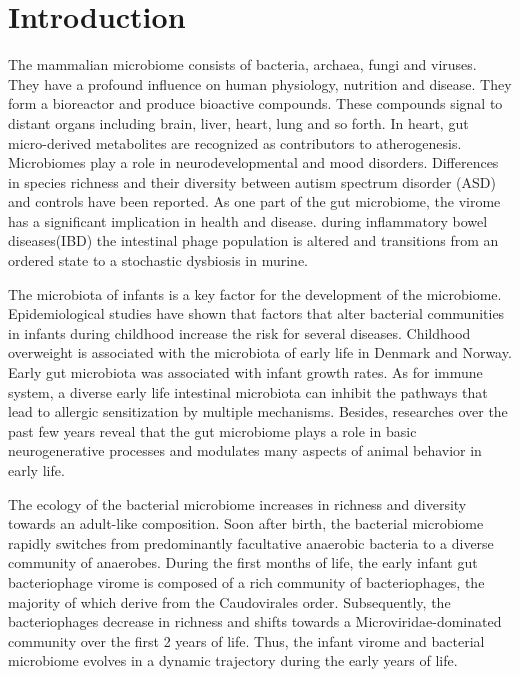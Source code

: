 \documentclass[a4paper][11pt][titlepage]{article}
\begin{document}
  \section{Introduction}
   The mammalian microbiome consists of bacteria, archaea, fungi and viruses.\cite{Lynch2016}
    They have a profound influence on human physiology, nutrition and disease.\cite{Qin2010}
    They form a bioreactor and produce bioactive compounds. 
   These compounds signal to distant organs including brain, liver, heart,
   lung and so forth.\cite{Schroeder2016} In heart, gut micro-derived metabolites are recognized 
   as contributors to atherogenesis.\cite{wang2011gut}  Microbiomes play a role in neurodevelopmental 
   and mood disorders.\cite{de2014food} Differences in species richness and their diversity between 
   autism spectrum disorder (ASD) and controls have been reported.\cite{williams2012application} As one part of the 
   gut microbiome, the virome has a significant implication in health and disease.\cite{virgin2014virome} during
    inflammatory bowel diseases(IBD) the intestinal phage population is altered and 
    transitions from an ordered state to a stochastic dysbiosis in murine.\cite{duerkop2018murine}

    The microbiota of infants is a key factor for the development of the microbiome.\cite{stewart2018temporal}
    Epidemiological studies have shown that factors that alter bacterial communities in 
    infants during childhood increase the risk for several diseases.\cite{tamburini2016microbiome} Childhood overweight 
    is associated with the microbiota of early life in Denmark\cite{ajslev2011childhood} and Norway\cite{stanislawski2018gut}. Early gut
     microbiota was associated with infant growth rates.\cite{white2013novel} As for immune system, a diverse 
     early life intestinal microbiota can inhibit the pathways that lead to allergic 
     sensitization by multiple mechanisms.\cite{reynolds2017early} Besides, researches over the past few years 
     reveal that the gut microbiome plays a role in basic neurogenerative processes and 
     modulates many aspects of animal behavior in early life.\cite{sharon2016central}

     The ecology of the bacterial microbiome increases in richness and diversity towards 
     an adult-like composition.\cite{yatsunenko2012human} Soon after birth, the bacterial microbiome rapidly switches 
     from predominantly facultative anaerobic bacteria to a diverse community of anaerobes.\cite{koenig2011succession}
     During the first months of life, the early infant gut bacteriophage virome is composed of 
     a rich community of bacteriophages, the majority of which derive from the Caudovirales 
     order. Subsequently, the bacteriophages decrease in richness and shifts towards a 
     Microviridae-dominated community over the first 2 years of life. Thus, the infant virome 
     and bacterial microbiome evolves in a dynamic trajectory during the early years of life.\cite{lim2015early}
\end{document}
